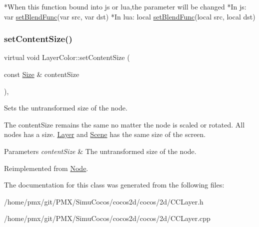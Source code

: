\begin{DoxyCode}
*When \textcolor{keyword}{this} \textcolor{keyword}{function} bound into js or lua,the parameter will be changed
*In js: var \hyperlink{classLayerColor_ae71bee82fac9f5b984a6fdaf69c97d73}{setBlendFunc}(var src, var dst)
*In lua: local \hyperlink{classLayerColor_ae71bee82fac9f5b984a6fdaf69c97d73}{setBlendFunc}(local src, local dst)
\end{DoxyCode}
 \mbox{\label{classLayerColor_a3db3f4ffab871cc95a3dca8476c22251}} 
\subsubsection{\texorpdfstring{set\+Content\+Size()}{setContentSize()}}
{\footnotesize\ttfamily virtual void Layer\+Color\+::set\+Content\+Size (\begin{DoxyParamCaption}\item[{const \hyperlink{classSize}{Size} \&}]{content\+Size }\end{DoxyParamCaption})\hspace{0.3cm}{\ttfamily [override]}, {\ttfamily [virtual]}}

Sets the untransformed size of the node.

The content\+Size remains the same no matter the node is scaled or rotated. All nodes has a size. \hyperlink{classLayer}{Layer} and \hyperlink{classScene}{Scene} has the same size of the screen.


\begin{DoxyParams}{Parameters}
{\em content\+Size} & The untransformed size of the node. \\
\hline
\end{DoxyParams}


Reimplemented from \hyperlink{classNode_ade113d7fc9244f58ac98a4712da49818}{Node}.



The documentation for this class was generated from the following files\+:\begin{DoxyCompactItemize}
\item 
/home/pmx/git/\+P\+M\+X/\+Simu\+Cocos/cocos2d/cocos/2d/C\+C\+Layer.\+h\item 
/home/pmx/git/\+P\+M\+X/\+Simu\+Cocos/cocos2d/cocos/2d/C\+C\+Layer.\+cpp\end{DoxyCompactItemize}
